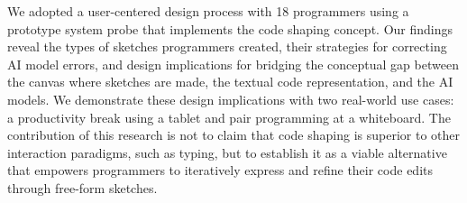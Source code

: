 We adopted a user-centered design process with 18 programmers using a prototype system probe that implements the code shaping concept. Our findings reveal the types of sketches programmers created, their strategies for correcting AI model errors, and design implications for bridging the conceptual gap between the canvas where sketches are made, the textual code representation, and the AI models. We demonstrate these design implications with two real-world use cases: a productivity break using a tablet and pair programming at a whiteboard.
The contribution of this research is not to claim that code shaping is superior to other interaction paradigms, such as typing, but to establish it as a viable alternative that empowers programmers to iteratively express and refine their code edits through free-form sketches. 










